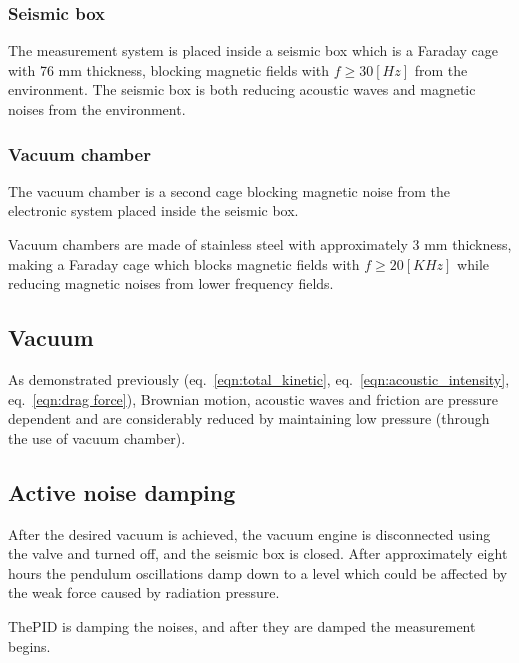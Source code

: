 \documentclass[\main/master.tex]{subfiles}
\begin{document}
\subsubsection{Seismic box}
The measurement system is placed inside a seismic box which is a Faraday cage with 76 mm thickness, blocking magnetic fields with $f \ge 30 [Hz]$ from the environment. The seismic box is both reducing acoustic waves and magnetic noises from the environment.
\subsubsection{Vacuum chamber}
The vacuum chamber is a second cage blocking magnetic noise from the electronic system placed inside the seismic box.
\par\noindent
Vacuum chambers are made of stainless steel with approximately 3 mm thickness, making a Faraday cage which blocks magnetic fields with $f\ge 20 [KHz]$ while reducing magnetic noises from lower frequency fields.
\subsection{Vacuum}
\par\noindent
As demonstrated previously (eq.~\ref{eqn:total_kinetic}, eq.~\ref{eqn:acoustic_intensity}, eq.~\ref{eqn:drag force}), Brownian motion, acoustic waves and friction are pressure dependent and are considerably reduced by maintaining low pressure (through the use of vacuum chamber).
\subsection{Active noise damping}
\par\noindent
After the desired vacuum is achieved, the vacuum engine is disconnected using the valve and turned off, and the seismic box is closed. After approximately eight hours the pendulum oscillations damp down to a level which could be affected by the weak force caused by radiation pressure.


\par\noindent
ThePID is damping the noises, and after they are damped the measurement begins.
\end{document}
